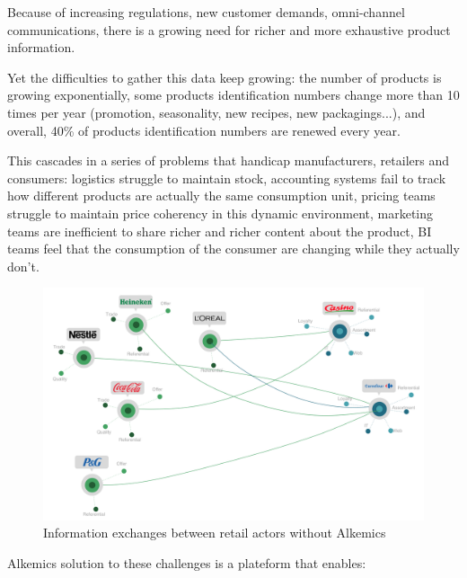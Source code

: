 Because of increasing regulations, new customer demands, omni-channel communications, there is a growing need for richer and more exhaustive product information. 

Yet the difficulties to gather this data keep growing: the number of products is growing exponentially, some products identification numbers change more than 10 times per year (promotion, seasonality, new recipes, new packagings...), and overall, 40\% of products identification numbers are renewed every year.

This cascades in a series of problems that handicap manufacturers, retailers and consumers: logistics struggle to maintain stock, accounting systems fail to track how different products are actually the same consumption unit, pricing teams struggle to maintain price coherency in this dynamic environment, marketing teams are inefficient to share richer and richer content about the product, BI teams feel that the consumption of the consumer are changing while they actually don't. 


\begin{figure}[H]
\centering
\includegraphics[scale=0.35]{./images/introduction/without_alk.png}
\caption{Information exchanges between retail actors without Alkemics}
\end{figure}


Alkemics solution to these challenges is a plateform that enables:
\\

